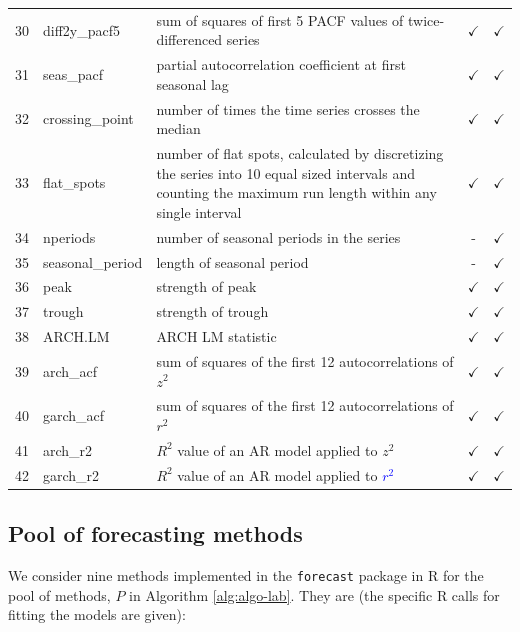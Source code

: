 \documentclass[11pt,a4paper,]{article}
\def\yes{$\checkmark$}
\theoremstyle{definition}
\theoremstyle{definition}
\theoremstyle{definition}
\theoremstyle{remark}
\begin{document}
\begin{table}[!htp]
\begin{tabular}{llp{}cc}
30 & diff2y\_pacf5  & sum of squares of first 5 PACF values of twice-differenced series                       & \yes  & \yes \\
31 & seas\_pacf  & partial autocorrelation coefficient at first seasonal lag                       & \yes  & \yes \\
32 & crossing\_point  & number of times the time series crosses the median                     & \yes  & \yes \\
33 & flat\_spots  & number of flat spots, calculated by discretizing the series into 10 equal sized intervals and counting the maximum run length within any single interval                       & \yes  & \yes \\
34 & nperiods  & number of seasonal periods in the series & -  & \yes \\
35 & seasonal\_period  & length of seasonal period                       & -  & \yes \\
36 & peak  & strength of peak                      & \yes  & \yes \\
37 & trough  & strength of trough                      & \yes  & \yes \\
38 & ARCH.LM  & ARCH LM statistic                      & \yes  & \yes \\
39 & arch\_acf  &    sum of squares of the first 12 autocorrelations of $z^2$               & \yes  & \yes \\
40 & garch\_acf  &  sum of squares of the first 12 autocorrelations of $r^2$                 & \yes  & \yes \\
41 & arch\_r2  &     $R^2$ value of an AR model applied to $z^2$              & \yes  & \yes \\
42 & garch\_r2  &   $R^2$ value of an AR model applied to \textcolor{blue}{$r^2$}               & \yes  & \yes \\
\bottomrule
 \end{tabular}
\end{table}

\clearpage

\subsection{Pool of forecasting
methods}\label{pool-of-forecasting-methods}

We consider nine methods implemented in the \texttt{forecast} package in
R \autocite{forecast} for the pool of methods, \(P\) in Algorithm
\ref{alg:algo-lab}. They are (the specific R calls for fitting the
models are given):
\end{document}
